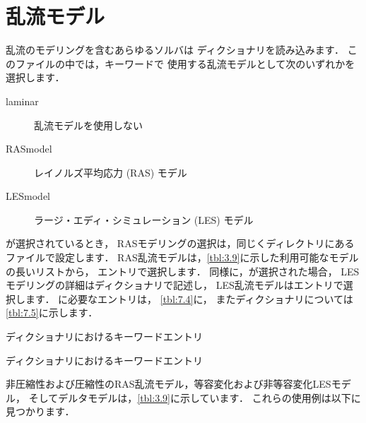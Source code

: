 \section{乱流モデル}
\label{sec:7.2}
乱流のモデリングを含むあらゆるソルバは
%
%
ディクショナリを読み込みます．
このファイルの中では，キーワードで
使用する乱流モデルとして次のいずれかを選択します．
\begin{description}
 \item[laminar] 乱流モデルを使用しない
 \item[RASmodel] レイノルズ平均応力 (RAS) モデル
 \item[LESmodel] ラージ・エディ・シミュレーション (LES) モデル
\end{description}

が選択されているとき，
RASモデリングの選択は，同じくディレクトリにある
ファイルで設定します．
RAS乱流モデルは，\autoref{tbl:3.9}に示した利用可能なモデルの長いリストから，
エントリで選択します．
同様に，が選択された場合，
LESモデリングの詳細はディクショナリで記述し，
LES乱流モデルはエントリで選択します．
に必要なエントリは，
\autoref{tbl:7.4}に，
またディクショナリについては
\autoref{tbl:7.5}に示します．


\begin{table}[ht]
 
 \caption{ディクショナリにおけるキーワードエントリ}
 \label{tbl:7.4}
\end{table}


\begin{table}[ht]
 
 \caption{ディクショナリにおけるキーワードエントリ}
 \label{tbl:7.5}
\end{table}


非圧縮性および圧縮性のRAS乱流モデル，等容変化および非等容変化LESモデル，
そしてデルタモデルは，\autoref{tbl:3.9}に示しています．
これらの使用例は以下に見つかります．

